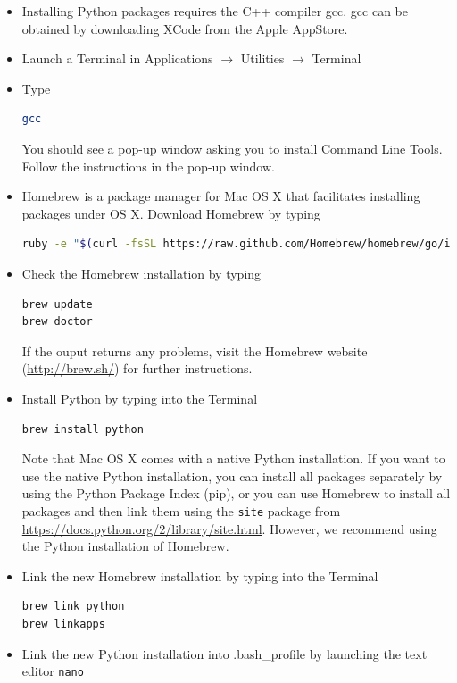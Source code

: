 \documentclass[a4paper,11pt]{article}
\begin{document}
\begin{itemize}
 \item Installing Python packages requires the C++ compiler gcc. gcc can be obtained by downloading XCode from the Apple AppStore.
 \item Launch a Terminal in Applications $\rightarrow$ Utilities $\rightarrow$ Terminal
 \item Type
 \begin{lstlisting}[frame=single,language=bash]  
gcc
\end{lstlisting}
You should see a pop-up window asking you to install Command Line Tools. Follow the instructions in the pop-up window.
\item Homebrew is a package manager for Mac OS X that facilitates installing packages under OS X. Download Homebrew by typing
\begin{lstlisting}[frame=single,language=bash]  
ruby -e "$(curl -fsSL https://raw.github.com/Homebrew/homebrew/go/install)"
\end{lstlisting}
\item Check the Homebrew installation by typing
\begin{lstlisting}[frame=single,language=bash]  
brew update
brew doctor
\end{lstlisting}
If the ouput returns any problems, visit the Homebrew website (\href{http://brew.sh/}{http://brew.sh/}) for further instructions.
\item Install Python by typing into the Terminal
\begin{lstlisting}[frame=single,language=bash]  
brew install python
\end{lstlisting}
Note that Mac OS X comes with a native Python installation. If you want to use the native Python installation, you can install all packages separately by using the Python Package Index (pip), or you can use Homebrew to install all packages and then link them using the \verb+site+ package from \href{https://docs.python.org/2/library/site.html}{https://docs.python.org/2/library/site.html}. However, we recommend using the Python installation of Homebrew. 
\item Link the new Homebrew installation by typing into the Terminal
\begin{lstlisting}[frame=single,language=bash]  
brew link python
brew linkapps
\end{lstlisting}
\item Link the new Python installation into .bash\_profile by launching the text editor \verb+nano+
\begin{lstlisting}[frame=single,language=bash]  

\end{lstlisting}
\end{itemize}
\end{document}
